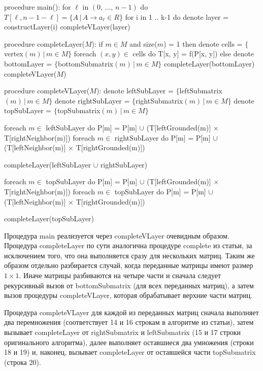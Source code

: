 \documentclass[12pt]{article}  %
\theoremstyle{definition}
\theoremstyle{remark}
\begin{document}
\begin{algorithm}[caption={Algorithm.}, label={main}]
procedure main():
  for $\ell$ in $(0,\,\dots,\,n-1)$ do
    $T[\ell, n-1-\ell] = \{A\,|\,A \to a_{\ell} \in R\}$
  for i in 1 .. k-1 do
    denote layer = constructLayer(i)
    completeVLayer(layer)  

procedure completeLayer($M$):
  if $m \in M$ and size($m$) = 1 then
    denote cells = $\{$vertex$(m)\,|\, m \in M\}$
    foreach $(x, y) \in $ cells do
      T[x, y] = f(P[x, y])
  else
    denote bottomLayer = $\{$bottomSubmatrix$(m)\,|\,m \in M\}$
    completeLayer(bottomLayer)
    completeVLayer($M$)     

procedure completeVLayer($M$):
  denote leftSubLayer = $\{$leftSubmatrix$(m)\,|\,m \in M\}$
  denote rightSubLayer = $\{$rightSubmatrix$(m)\,|\,m \in M\}$
  denote topSubLayer = $\{$topSubmatrix$(m)\,|\,m \in M\}$

  foreach $m \in$ leftSubLayer do
    P[m] = P[m] $\cup$ (T[leftGrounded(m)] $\times$ T[rightNeighbor(m)])
  foreach $m \in$ rightSubLayer do
    P[m] = P[m] $\cup$ (T[leftNeighbor(m)] $\times$ T[rightGrounded(m)])

  completeLayer(leftSubLayer $\cup$ rightSubLayer)

  foreach $m \in$ topSubLayer do
    P[m] = P[m] $\cup$ (T[leftGrounded(m)] $\times$ T[rightNeighbor(m)])
  foreach $m \in$ topSubLayer do
    P[m] = P[m] $\cup$ (T[leftNeighbor(m)] $\times$ T[rightGrounded(m)])

  completeLayer(topSubLayer)  
\end{algorithm}

Процедура main реализуется через completeVLayer очевидным образом. Процедура completeLayer по сути аналогична процедуре complete из статьи, за исключением того, что она выполняется сразу для нескольких матриц. Таким же образом отдельно разбирается случай, когда переданные матрицы имеют размер $1 \times 1$. Иначе матрицы разбиваются на четыре части и сначала следует рекурсивный вызов от bottomSubmatrix (для всех переданных матриц), а затем вызов процедуры completeVLayer, которая обрабатывает верхние части матриц. 

Процедура completeVLayer для каждой из переданных матриц сначала выполняет два перемножения (соответствует 14 и 16 строкам в алгоритме из статьи), затем вызывает completeLayer от rightSubmatrix и leftSubmatrix (15 и 17 строки оригинального алгоритма), далее выполняет оставшиеся два умножения (строки 18 и 19) и, наконец, вызывает completeLayer от оставшейся части topSubmatrix (строка 20).
\end{document}
